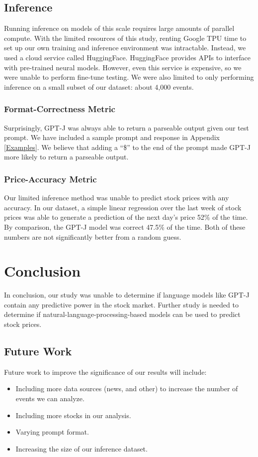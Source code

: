 \documentclass[conference]{IEEEtran}
\begin{document}
\subsection{Inference}
Running inference on models of this scale requires large amounts of parallel compute. With the limited resources of this study, renting Google TPU time to set up our own training and inference environment was intractable. Instead, we used a cloud service called HuggingFace. HuggingFace provides APIs to interface with pre-trained neural models. However, even this service is expensive, so we were unable to perform fine-tune testing. We were also limited to only performing inference on a small subset of our dataset: about 4,000 events.
\subsubsection{Format-Correctness Metric}
Surprisingly, GPT-J was always able to return a parseable output given our test prompt. We have included a sample prompt and response in Appendix \ref{Examples}. We believe that adding a ``\$'' to the end of the prompt made GPT-J more likely to return a parseable output.
\subsubsection{Price-Accuracy Metric}
Our limited inference method was unable to predict stock prices with any accuracy. In our dataset, a simple linear regression over the last week of stock prices was able to generate a prediction of the next day's price 52\% of the time. By comparison, the GPT-J model was correct 47.5\% of the time. Both of these numbers are not significantly better from a random guess. 
\section{Conclusion}
In conclusion, our study was unable to determine if language models like GPT-J contain any predictive power in the stock market. Further study is needed to determine if natural-language-processing-based models can be used to predict stock prices.
\subsection{Future Work}
Future work to improve the significance of our results will include:
\begin{itemize}
    \item Including more data sources (news, and other) to increase the number of events we can analyze.
    \item Including more stocks in our analysis.
    \item Varying prompt format.
    \item Increasing the size of our inference dataset.
\end{itemize}
\end{document}
